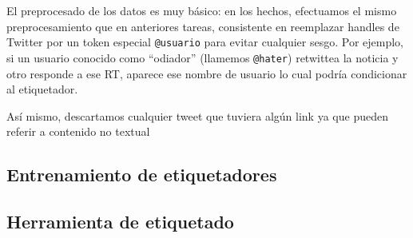 El preprocesado de los datos es muy básico: en los hechos, efectuamos el mismo preprocesamiento que en anteriores tareas, consistente en reemplazar handles de Twitter por un token especial \verb|@usuario| para evitar cualquier sesgo. Por ejemplo, si un usuario conocido como ``odiador'' (llamemos \verb|@hater|) retwittea la noticia y otro responde a ese RT, aparece ese nombre de usuario lo cual podría condicionar al etiquetador.

Así mismo, descartamos cualquier tweet que tuviera algún link ya que pueden referir a contenido no textual


\subsection{Entrenamiento de etiquetadores}



%
%
\subsection{Herramienta de etiquetado}


